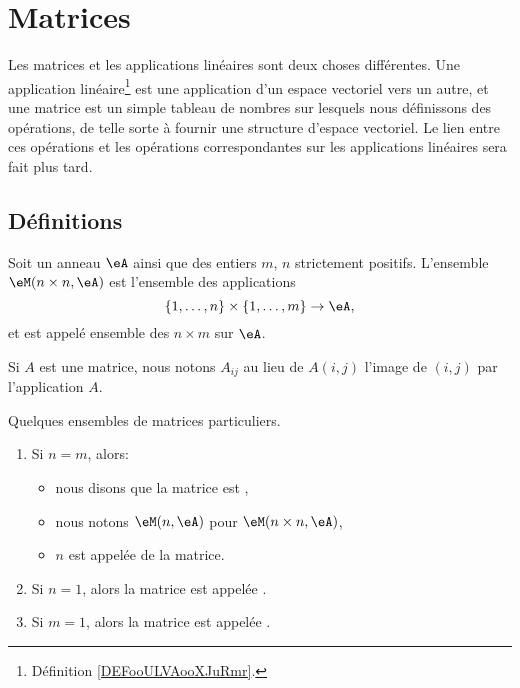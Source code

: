 \section{Matrices}

Les matrices et les applications linéaires sont deux choses différentes. Une application linéaire\footnote{Définition \ref{DEFooULVAooXJuRmr}.} est une application d'un espace vectoriel vers un autre, et une matrice est un simple tableau de nombres sur lesquels nous définissons des opérations, de telle sorte à fournir une structure d'espace vectoriel. Le lien entre ces opérations et les opérations correspondantes sur les applications linéaires sera fait plus tard.


\subsection{Définitions}

\begin{definition}
    Soit un anneau \( \eA\) ainsi que des entiers \( m\), \( n\) strictement positifs. L'ensemble \( \eM(n\times n,\eA)\) est l'ensemble des applications
    \begin{equation}
        \{ 1,\ldots, n \}\times \{ 1,\ldots, m \}\to \eA,
    \end{equation}
    et est appelé ensemble des  \(n\times m\) sur \( \eA \).
\end{definition}
Si \( A\) est une matrice, nous notons \( A_{ij}\) au lieu de \( A(i,j)\) l'image de \( (i,j)\) par l'application \( A\).


\begin{definition}
Quelques ensembles de matrices particuliers.
  \begin{enumerate}
  \item Si \( n=m\), alors:
  \begin{itemize}
    \item nous disons que la matrice est ,
    \item nous notons \( \eM(n,\eA)\) pour \( \eM(n\times n,\eA)\),
    \item \( n \) est appelée  de la matrice.
  \end{itemize}
  \item Si \( n = 1 \), alors la matrice est appelée .
    \item Si \( m = 1 \), alors la matrice est appelée .
  \end{enumerate}
\end{definition}

